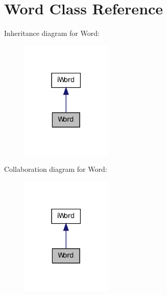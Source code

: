 \hypertarget{classWord}{
\section{Word Class Reference}
\label{classWord}
}


Inheritance diagram for Word:
\nopagebreak
\begin{figure}[H]
\begin{center}
\leavevmode
\includegraphics[width=122pt]{classWord__inherit__graph}
\end{center}
\end{figure}


Collaboration diagram for Word:
\nopagebreak
\begin{figure}[H]
\begin{center}
\leavevmode
\includegraphics[width=122pt]{classWord__coll__graph}
\end{center}
\end{figure}
